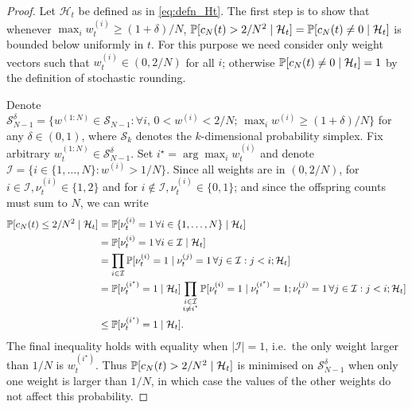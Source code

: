
\begin{proof}
Let $\mathcal{H}_t$ be defined as in \eqref{eq:defn_Ht}. The first step is to show that whenever $\max_i w_t^{(i)} \geq (1+\delta)/N$, $\mathbb{P}[  c_N(t) > 2/N^2 \mid \mathcal{H}_t ] = \mathbb{P}[ c_N(t) \neq 0 \mid \mathcal{H}_t ]$ is bounded below uniformly in $t$.
For this purpose we need consider only weight vectors such that $w_t^{(i)} \in (0,2/N)$ for all $i$; otherwise $\mathbb{P}[ c_N(t) \neq 0 \mid \mathcal{H}_t ] =1$ by the definition of stochastic rounding.

Denote $\mathcal{S}_{N-1}^\delta = \{ w^{(1:N)} \in \mathcal{S}_{N-1} :  \forall i, \, 0 <w^{(i)} <2/N ;\, \max_i w^{(i)} \geq (1 + \delta)/N \}$ for any $\delta \in (0, 1)$, where $\mathcal{S}_{k}$ denotes the $k$-dimensional probability simplex.
Fix arbitrary $w_t^{(1:N)} \in \mathcal{S}_{N-1}^\delta$. Set $i^\star = \arg\max_i w_t^{(i)}$ and denote $\mathcal{I} = \{i \in \{1,\dots,N\} : w^{(i)} > 1/N \}$.
Since all weights are in $(0, 2/N)$, for $i \in \mathcal{I}, \nu_t^{(i)} \in \{1,2\}$ and for $i \notin \mathcal{I}, \nu_t^{(i)} \in \{0,1\}$; and since the offspring counts must sum to $N$, we can write
\begin{align}\label{eq:smallcN_istar}
\mathbb{P}[ c_N(t) \leq 2/N^2 \mid \mathcal{H}_t ]
&= \mathbb{P}[ \nu_t^{(i)} =1 \,\forall i\in\{1,\dots,N\} \mid \mathcal{H}_t ] \notag\\
&= \mathbb{P}[ \nu_t^{(i)} =1 \,\forall i\in \mathcal{I} \mid \mathcal{H}_t ] \notag\\
&= \prod_{i \in \mathcal{I}} \mathbb{P}[ \nu_t^{(i)} =1 \mid \nu_t^{(j)}=1 \,\forall j \in \mathcal{I}: j<i; \mathcal{H}_t ] \notag\\
&= \mathbb{P}[ \nu_t^{(i^\star)} =1 \mid \mathcal{H}_t ] \prod_{\substack{i \in \mathcal{I} \\ i \neq i^\star}} \mathbb{P}[ \nu_t^{(i)} =1 \mid \nu_t^{(i^\star)}=1; \nu_t^{(j)}=1 \,\forall j \in \mathcal{I}: j<i ; \mathcal{H}_t ] \notag\\
&\leq \mathbb{P}[ \nu_t^{(i^\star)} =1 \mid \mathcal{H}_t ] .
\end{align}
The final inequality holds with equality when $|\mathcal{I}| =1$, i.e.\ the only weight larger than $1/N$ is $w_t^{(i^\star)}$.
Thus $\mathbb{P}[ c_N(t) > 2/N^2 \mid \mathcal{H}_t ]$ is minimised on $\mathcal{S}_{N-1}^\delta$ when only one weight is larger than $1/N$, in which case the values of the other weights do not affect this probability. 


\end{proof}
